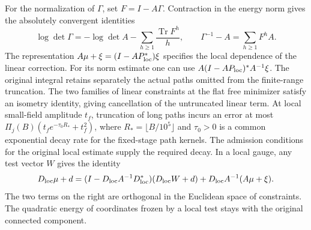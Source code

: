 \documentclass[11pt,a4paper]{article}
\numberwithin{equation}{section}
\begin{document}
For the normalization of \(\Gamma\), set \(F=I-A\Gamma\). Contraction in the energy norm gives the absolutely convergent identities
\begin{equation}
 \log\det\Gamma=-\log\det A-\sum_{h\ge1}\frac{\operatorname{Tr}F^h}{h},
 \qquad \Gamma^{-1}-A=\sum_{h\ge1}F^h A .
 \label{eq:geom-determinant}
\end{equation}
The representation \(A\mu+\xi=(I-AP_{\rm loc}^*)\xi\) specifies the local dependence of the linear correction. For its norm estimate one can use \(A(I-AP_{\rm loc})^*A^{-1}\xi\). The original integral retains separately the actual paths omitted from the finite-range truncation. The two families of linear constraints at the flat free minimizer satisfy an isometry identity, giving cancellation of the untruncated linear term. At local small-field amplitude \(t_f\), truncation of long paths incurs an error at most
\(\Pi_j(B)(t_f e^{-\tau_0R_*}+t_f^2)\), where \(R_*=\lfloor B/10^5\rfloor\) and \(\tau_0>0\) is a common exponential decay rate for the fixed-stage path kernels. The admission conditions for the original local estimate supply the required decay. In a local gauge, any test vector \(W\) gives the identity
\[
 D_{\rm loc}\mu+d=(I-D_{\rm loc}A^{-1}D_{\rm loc}^*)(D_{\rm loc}W+d)
                +D_{\rm loc}A^{-1}(A\mu+\xi).
\]
The two terms on the right are orthogonal in the Euclidean space of constraints. The quadratic energy of coordinates frozen by a local test stays with the original connected component.
\end{document}
